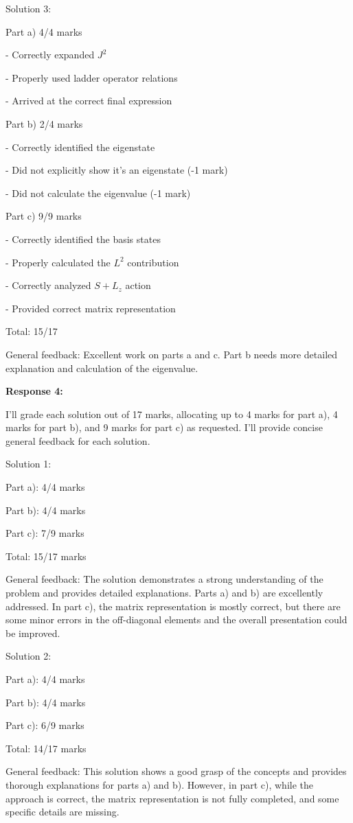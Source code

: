 \documentclass[a4paper,11pt]{article}
\begin{document}
Solution 3:

Part a) 4/4 marks

- Correctly expanded \(J^2\)

- Properly used ladder operator relations

- Arrived at the correct final expression

Part b) 2/4 marks

- Correctly identified the eigenstate

- Did not explicitly show it's an eigenstate (-1 mark)

- Did not calculate the eigenvalue (-1 mark)

Part c) 9/9 marks

- Correctly identified the basis states

- Properly calculated the \(L^2\) contribution

- Correctly analyzed \(S+L_z\) action

- Provided correct matrix representation

Total: 15/17

General feedback: Excellent work on parts a and c. Part b needs more detailed explanation and calculation of the eigenvalue.

\bigskip
\textbf{Response 4:}

I'll grade each solution out of 17 marks, allocating up to 4 marks for part a), 4 marks for part b), and 9 marks for part c) as requested. I'll provide concise general feedback for each solution.

Solution 1:

Part a): 4/4 marks

Part b): 4/4 marks

Part c): 7/9 marks

Total: 15/17 marks

General feedback: The solution demonstrates a strong understanding of the problem and provides detailed explanations. Parts a) and b) are excellently addressed. In part c), the matrix representation is mostly correct, but there are some minor errors in the off-diagonal elements and the overall presentation could be improved.

Solution 2:

Part a): 4/4 marks

Part b): 4/4 marks

Part c): 6/9 marks

Total: 14/17 marks

General feedback: This solution shows a good grasp of the concepts and provides thorough explanations for parts a) and b). However, in part c), while the approach is correct, the matrix representation is not fully completed, and some specific details are missing.
\end{document}
